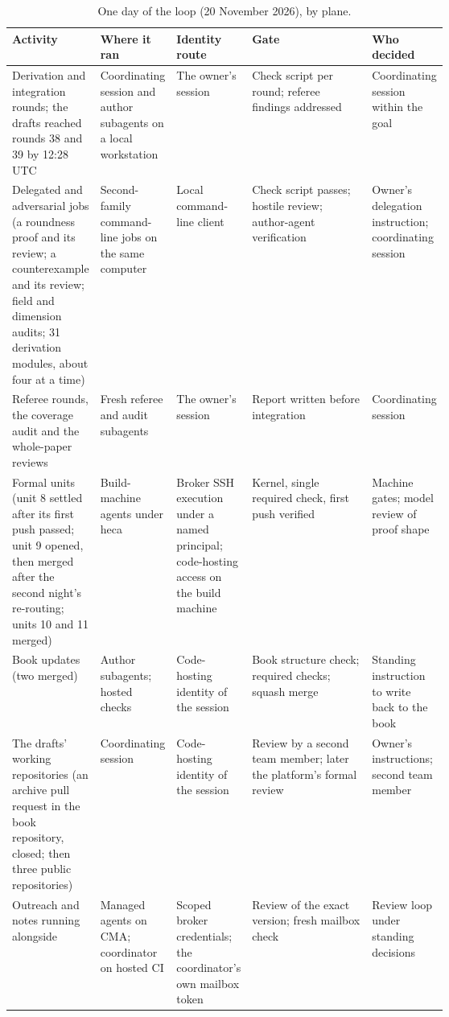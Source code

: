 \documentclass[11pt]{article}
\begin{document}
\begin{table}[htbp]
\centering\footnotesize
\caption{One day of the loop (20 November 2026), by plane.}
\label{tab:oneday}
\begin{tabularx}{\linewidth}{@{}>{\raggedright\arraybackslash}p{0.17\linewidth}>{\raggedright\arraybackslash}p{0.17\linewidth}>{\raggedright\arraybackslash}p{0.16\linewidth}>{\raggedright\arraybackslash}X>{\raggedright\arraybackslash}p{0.13\linewidth}@{}}
\toprule
Activity & Where it ran & Identity route & Gate & Who decided \\
\midrule
Derivation and integration rounds; the drafts reached rounds 38 and 39 by 12:28 UTC & Coordinating session and author subagents on a local workstation & The owner's session & Check script per round; referee findings addressed & Coordinating session within the goal \\
Delegated and adversarial jobs (a roundness proof and its review; a counterexample and its review; field and dimension audits; 31 derivation modules, about four at a time) & Second-family command-line jobs on the same computer & Local command-line client & Check script passes; hostile review; author-agent verification & Owner's delegation instruction; coordinating session \\
Referee rounds, the coverage audit and the whole-paper reviews & Fresh referee and audit subagents & The owner's session & Report written before integration & Coordinating session \\
Formal units (unit 8 settled after its first push passed; unit 9 opened, then merged after the second night's re-routing; units 10 and 11 merged) & Build-machine agents under heca & Broker SSH execution under a named principal; code-hosting access on the build machine & Kernel, single required check, first push verified & Machine gates; model review of proof shape \\
Book updates (two merged) & Author subagents; hosted checks & Code-hosting identity of the session & Book structure check; required checks; squash merge & Standing instruction to write back to the book \\
The drafts' working repositories (an archive pull request in the book repository, closed; then three public repositories) & Coordinating session & Code-hosting identity of the session & Review by a second team member; later the platform's formal review & Owner's instructions; second team member \\
Outreach and notes running alongside & Managed agents on CMA; coordinator on hosted CI & Scoped broker credentials; the coordinator's own mailbox token & Review of the exact version; fresh mailbox check & Review loop under standing decisions \\
\bottomrule
\end{tabularx}
\end{table}
\end{document}
